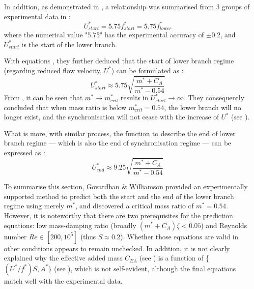 In addition, as demonstrated in , a relationship was summarised from 3 groups of experimental data in :
\begin{equation}
	U^*_{start}=5.75{f^*_{start}}=5.75f^*_{lower}
	\label{eq:ufstart}
\end{equation}
where the numerical value "5.75" has the experimental accuracy of $\pm0.2$, and $ U^*_{start} $ is the start of the lower branch.

With equations , they \cite{GOVARDHAN2000} further deduced that the start of lower branch regime (regarding reduced flow velocity, $U^*$) can be formulated as :
\begin{equation}
	U^*_{start} \approx 5.75\sqrt{\frac{m^*+C_A}{m^*-0.54}}
	\label{eq:ulstart}
\end{equation}
From , it can be seen that $m^* \rightarrow m^*_{crit}$ results in $ U^*_{start} \rightarrow \infty$. They consequently concluded that when mass ratio is below $m^*_{crit}=0.54$, the lower branch will no longer exist, and the synchronisation will not cease with the increase of $U^*$ (see ).

What is more, with similar process, the function to describe the end of lower branch regime --- which is also the end of synchronisation regime --- can be expressed as :
\begin{equation}
U^*_{end} \approx 9.25\sqrt{\frac{m^*+C_A}{m^*-0.54}}
\label{eq:ulend}
\end{equation}

To summarise this section, Govardhan \& Williamson \cite{GOVARDHAN2000} provided an experimentally supported method to predict both the start and the end of the lower branch regime using merely $m^*$, and discovered a critical mass ratio of $m^*=0.54$. However, it is noteworthy that there are two prerequisites for the prediction equations: low mass-damping ratio (broadly $(m^*+C_A)\zeta < 0.05$) and Reynolds number $Re \in [200,10^5]$ (thus $S\approx0.2$). Whether those equations are valid in other conditions appears to remain unchecked. In addition, it is not clearly explained why the effective added mass $C_{EA}$ (see ) is a function of \{$(U^*/f^*)S, A^*$\} (see ), which is not self-evident, although the final equations match well with the experimental data.




